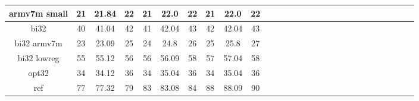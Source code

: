 \documentclass[12pt,a4paper,italian]{report}
\begin{document}
\begin{landscape}
\begin{table}[]
\begin{adjustbox}{width=600pt}
\begin{tabular}{|c|c|c|c|c|c|c|c|c|c|c|c|c|c|c|c|c|c|c|c|c|c|c|c|c|c|c|c|}
				\hline
				armv7m small & 21 & 21.84 & 22 & 21 & 22.0 & 22 & 21 & 22.0 & 22 & & & & & & & & & & & & & & & & & & \\
				\hline
				bi32 & 40 & 41.04 & 42 & 41 & 42.04 & 43 & 42 & 42.04 & 43 & & & & & & & & & & & & & & & & & & \\
				\hline
				bi32 armv7m & 23 & 23.09 & 25 & 24 & 24.8 & 26 & 25 & 25.8 & 27 & & & & & & & & & & & & & & & & & & \\
				\hline
				bi32 lowreg & 55 & 55.12 & 56 & 56 & 56.09 & 58 & 57 & 57.04 & 58 & & & & & & & & & & & & & & & & & & \\
				\hline
				opt32 & 34 & 34.12 & 36 & 34 & 35.04 & 36 & 34 & 35.04 & 36 & & & & & & & & & & & & & & & & & & \\
				\hline
				ref & 77 & 77.32 & 79 & 83 & 83.08 & 84 & 88 & 88.09 & 90 & & & & & & & & & & & & & & & & & & \\
				\hline
			\end{tabular}
		\end{adjustbox}
	\end{table}
\end{landscape}
\end{document}
